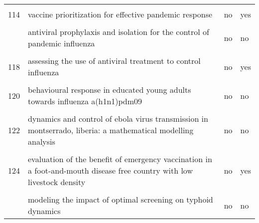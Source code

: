 \documentclass[
]{article}
\begin{document}
\begin{landscape}
\begin{longtable}{l>{\raggedright\arraybackslash}p{4cm}l>{\raggedright\arraybackslash}p{4cm}}
\cellcolor{gray!6}{113} & \cellcolor{gray!6}{treatment–donation-stockpile dynamics in ebola convalescent blood transfusion therapy} & \cellcolor{gray!6}{no} & \cellcolor{gray!6}{no}\\
114 & vaccine prioritization for effective pandemic response & no & yes\\
\cellcolor{gray!6}{115} & \cellcolor{gray!6}{a mathematical study of a tb model with treatment interruptions and two latent periods} & \cellcolor{gray!6}{no} & \cellcolor{gray!6}{no}\\
\addlinespace
116 & antiviral prophylaxis and isolation for the control of pandemic influenza & no & no\\
\cellcolor{gray!6}{117} & \cellcolor{gray!6}{assessing the impact of travel restrictions on international spread of the 2014 west african ebola epidemic} & \cellcolor{gray!6}{no} & \cellcolor{gray!6}{no}\\
118 & assessing the use of antiviral treatment to control influenza & no & yes\\
\cellcolor{gray!6}{119} & \cellcolor{gray!6}{behavior in the time of cholera: evidence from the 2008-2009 cholera outbreak in zimbabwe} & \cellcolor{gray!6}{no} & \cellcolor{gray!6}{no}\\
120 & behavioural response in educated young adults towards influenza a(h1n1)pdm09 & no & no\\
\addlinespace
\cellcolor{gray!6}{121} & \cellcolor{gray!6}{cover your cough! quantifying the benefits of a localized healthy behavior intervention on flu epidemics in washington dc} & \cellcolor{gray!6}{no} & \cellcolor{gray!6}{yes}\\
122 & dynamics and control of ebola virus transmission in montserrado, liberia: a mathematical modelling analysis & no & no\\
\cellcolor{gray!6}{123} & \cellcolor{gray!6}{estimating the effectiveness of early control measures through school absenteeism surveillance in observed outbreaks at rural schools in hubei, china} & \cellcolor{gray!6}{no} & \cellcolor{gray!6}{no}\\
124 & evaluation of the benefit of emergency vaccination in a foot-and-mouth disease free country with low livestock density & no & yes\\
\cellcolor{gray!6}{125} & \cellcolor{gray!6}{modeling the dynamics of oral poliovirus vaccine cessation} & \cellcolor{gray!6}{no} & \cellcolor{gray!6}{yes}\\
\addlinespace
126 & modeling the impact of optimal screening on typhoid dynamics & no & no\\

\end{longtable}
\end{landscape}
\end{document}
